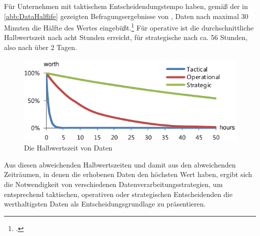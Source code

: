 


Für Unternehmen mit taktischem Entscheidendungstempo haben, gemäß der in \autoref{abb:DataHalflife} gezeigten Befragungsergebnisse von \citeauthor{NucleusResarchInc..2012}, Daten nach maximal 30 Minuten die Hälfte des Wertes eingebüßt.\footcite[Vgl. auch im Folgenden][6]{NucleusResarchInc..2012} Für operative  ist die durchschnittliche Halbwertszeit nach acht Stunden erreicht, für strategische  nach ca. 56 Stunden, also nach über 2 Tagen.



\begin{figure}[H]
\centering
\includegraphics[width=\textwidth]{graphics/half-life-data.pdf}
\caption[Die Halbwertszeit von Daten]{Die Halbwertszeit von Daten\footnotemark}
\label{abb:DataHalflife}
\end{figure}
Aus diesen abweichenden Halbwertszeiten und damit aus den abweichenden Zeiträumen, in denen die erhobenen Daten den höchsten Wert haben, ergibt sich die Notwendigkeit von verschiedenen Datenverarbeitungsstrategien, um entsprechend taktischen, operativen oder strategischen  Entscheidenden die werthaltigsten Daten als Entscheidungsgrundlage zu präsentieren.

